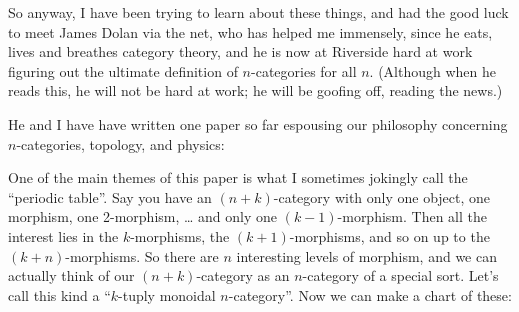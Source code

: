 \documentclass{article}
\def\tightlist{}
\renewcommand{\texttt}[1]{%
  \begingroup
  \ttfamily
  \begingroup\lccode`~=`/\lowercase{\endgroup\def~}{/\discretionary{}{}{}}%
  \begingroup\lccode`~=`[\lowercase{\endgroup\def~}{[\discretionary{}{}{}}%
  \begingroup\lccode`~=`.\lowercase{\endgroup\def~}{.\discretionary{}{}{}}%
  \catcode`/=\active\catcode`[=\active\catcode`.=\active
  \scantokens{#1\noexpand}%
  \endgroup
}
\begin{document}
So anyway, I have been trying to learn about these things, and had the
good luck to meet James Dolan via the net, who has helped me immensely,
since he eats, lives and breathes category theory, and he is now at
Riverside hard at work figuring out the ultimate definition of
\(n\)-categories for all \(n\). (Although when he reads this, he will
not be hard at work; he will be goofing off, reading the news.)

He and I have have written one paper so far espousing our philosophy
concerning \(n\)-categories, topology, and physics:


One of the main themes of this paper is what I sometimes jokingly call
the ``periodic table''. Say you have an \((n+k)\)-category with only one
object, one morphism, one 2-morphism, \ldots{} and only one
\((k-1)\)-morphism. Then all the interest lies in the \(k\)-morphisms,
the \((k+1)\)-morphisms, and so on up to the \((k+n)\)-morphisms. So
there are \(n\) interesting levels of morphism, and we can actually
think of our \((n+k)\)-category as an \(n\)-category of a special sort.
Let's call this kind a ``\(k\)-tuply monoidal \(n\)-category''. Now we
can make a chart of these:
\end{document}
